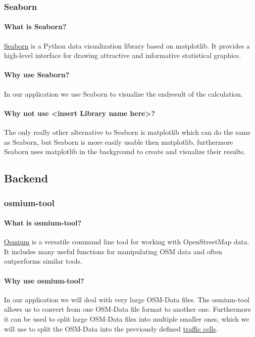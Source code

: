 \documentclass[parskip=full]{scrartcl} %
\begin{document}
\newpage

\subsubsection{Seaborn}
\paragraph{What is Seaborn?}
\href{https://seaborn.pydata.org/}{Seaborn} is a Python data visualization library based on matplotlib. It provides a high-level interface for drawing attractive and informative statistical graphics.

\paragraph{Why use Seaborn?}
In our application we use Seaborn to visualize the endresult of the calculation.

\paragraph{Why not use <insert Library name here>?}
The only really other alternative to Seaborn is matplotlib which can do the same as Seaborn, but Seaborn is more easily usable then matplotlib, furthermore Seaborn uses matplotlib in the background to create and visualize their results.

\subsection{Backend}

\subsubsection{osmium-tool}

\paragraph{What is osmium-tool?}
\href{https://osmcode.org/osmium-tool/}{Osmium}
is a versatile command line tool for working with OpenStreetMap data. It includes many useful functions for manipulating OSM data and often outperforms similar tools.

\paragraph{Why use osmium-tool?}
In our application we will deal with very large OSM-Data files.
The osmium-tool allows us to convert from one OSM-Data file format to another one. 
Furthermore it can be used to split large OSM-Data files into multiple smaller ones, which we will use to split the OSM-Data into the previously defined 
\hyperref[sec:Glossary]{traffic cells}.
\end{document}
